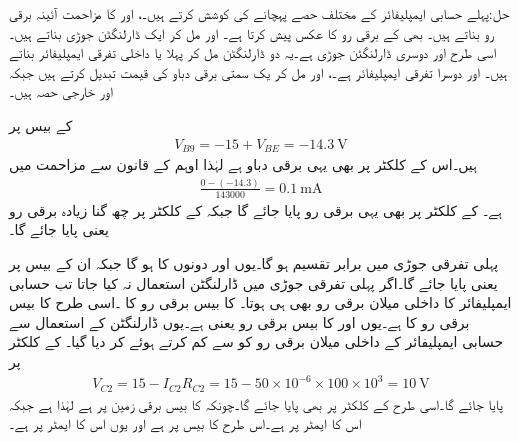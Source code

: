 حل:پہلے حسابی ایمپلیفائر کے مختلف حصے پہچانے کی کوشش کرتے ہیں۔،  اور  کا مزاحمت آئینہ برقی رو بناتے ہیں۔ بھی  کے برقی رو کا عکس پیش کرتا ہے۔ اور  مل کر ایک ڈارلنگٹن جوڑی بناتے ہیں۔اسی طرح  اور  دوسری ڈارلنگٹن جوڑی ہے۔یہ دو ڈارلنگٹن مل کر پہلا یا داخلی تفرقی ایمپلیفائر بناتے ہیں۔ اور  دوسرا تفرقی ایمپلیفائر ہے۔،  اور  مل کر یک سمتی برقی دباو  کی قیمت تبدیل کرتے ہیں جبکہ  اور  خارجی حصہ ہیں۔

 کے بیس پر
\begin{align*}
V_{B9}=-15+V_{BE}=\SI{-14.3}{\volt}
\end{align*}
ہیں۔اس کے کلکٹر پر بھی یہی برقی دباو ہے لہٰذا اوہم کے قانون سے  مزاحمت میں
\begin{align*}
\frac{0-(-14.3)}{143000}=\SI{0.1}{\milli \ampere}
\end{align*}
ہے۔ کے کلکٹر پر بھی یہی برقی رو پایا جائے گا جبکہ  کے کلکٹر پر چھ گنا زیادہ برقی رو یعنی  پایا جائے گا۔

پہلی تفرقی جوڑی میں   برابر تقسیم ہو گا۔یوں  اور  دونوں کا  ہو گا جبکہ ان کے بیس پر  یعنی  پایا جائے گا۔اگر پہلی تفرقی جوڑی میں ڈارلنگٹن استعمال نہ کیا جاتا تب حسابی ایمپلیفائر کا داخلی میلان برقی رو بھی  ہی ہوتا۔ کا بیس برقی رو  کا ۔اسی طرح  کا بیس برقی رو  کا  ہے۔یوں  اور  کا بیس برقی رو  یعنی  ہے۔یوں ڈارلنگٹن کے استعمال سے حسابی ایمپلیفائر کے داخلی میلان برقی رو کو  سے کم کرتے ہوئے  کر دیا گیا۔ کے کلکٹر پر
\begin{align*}
V_{C2}=15-I_{C2} R_{C2}=15 - 50 \times 10^{-6} \times 100 \times 10^{3}=\SI{10}{\volt}
\end{align*}   
پایا جائے گا۔اسی طرح  کے کلکٹر پر بھی  پایا جائے گا۔چونکہ  کا بیس برقی زمین پر ہے لہٰذا  ہے جبکہ اس کا ایمٹر  پر ہے۔اس طرح  کا بیس  پر ہے اور یوں اس کا ایمٹر  پر ہے۔

